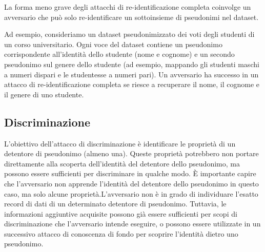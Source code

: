 La forma meno grave degli attacchi di re-identificazione completa coinvolge un avversario che può solo re-identificare un sottoinsieme di pseudonimi nel dataset.

Ad esempio, consideriamo un dataset pseudonimizzato dei voti degli studenti di un corso universitario. Ogni voce del dataset contiene un pseudonimo corrispondente all'identità dello studente (nome e cognome) e un secondo pseudonimo sul genere dello studente (ad esempio, mappando gli studenti maschi a numeri dispari e le studentesse a numeri pari). Un avversario ha successo in un attacco di re-identificazione completa se riesce a recuperare il nome, il cognome e il genere di uno studente.

\subsection{Discriminazione}

L'obiettivo dell'attacco di discriminazione è identificare le proprietà di un detentore di pseudonimo (almeno una). Queste proprietà potrebbero non portare direttamente alla scoperta dell'identità del detentore dello pseudonimo, ma possono essere sufficienti per discriminare in qualche modo.
È importante capire che l'avversario non apprende l'identità del detentore dello pseudonimo in questo caso, ma solo alcune proprietà.L'avversario non è in grado di individuare l'esatto record di dati di un determinato detentore di pseudonimo. Tuttavia, le informazioni aggiuntive acquisite possono già essere sufficienti per scopi di discriminazione che l'avversario intende eseguire, o possono essere utilizzate in un successivo attacco di conoscenza di fondo per scoprire l'identità dietro uno pseudonimo.


